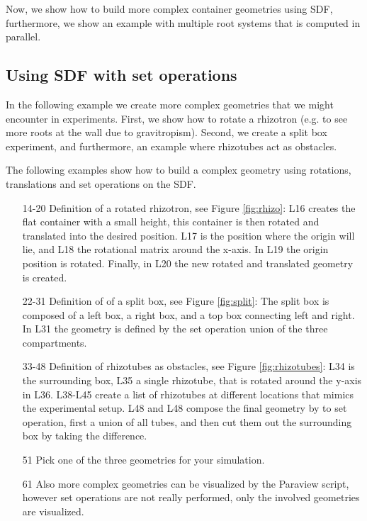 Now, we show how to build more complex container geometries using SDF, 
furthermore, we show an example with multiple root systems that is computed in parallel.

\subsection{Using SDF with set operations}

In the following example we create more complex geometries that we might encounter in experiments. 
First, we show how to rotate a rhizotron (e.g. to see more roots at the wall due to gravitropism). 
Second, we create a split box experiment, and furthermore, an example where rhizotubes act as obstacles.

The following examples show how to build a complex geometry using rotations, translations and set operations on the SDF.



\begin{itemize}

\item[14-20] Definition of a rotated rhizotron, see Figure \ref{fig:rhizo}: L16 creates the flat container with a small height, this container is then rotated and translated into the desired position. 
L17 is the position where the origin will lie, and L18 the rotational matrix around the x-axis. 
In L19 the origin position is rotated. Finally, in L20 the new rotated and translated geometry is created. 
\item[22-31] Definition of of a split box, see Figure \ref{fig:split}: The split box is composed of a left box, a right box, and a top box connecting left and right. In L31 the geometry is defined by the set operation union of the three compartments. 
\item[33-48] Definition of rhizotubes as obstacles, see Figure \ref{fig:rhizotubes}: L34 is the surrounding box, L35 a single rhizotube, that is rotated around the y-axis in L36. L38-L45 create a list of rhizotubes at different locations that mimics the experimental setup. 
L48 and L48 compose the final geometry by to set operation, first a union of all tubes, and then cut them out the surrounding box by taking the difference. 
\item[51] Pick one of the three geometries for your simulation.
\item[61] Also more complex geometries can be visualized by the Paraview script, however set operations are not really performed, only the involved geometries are visualized.

\end{itemize}

